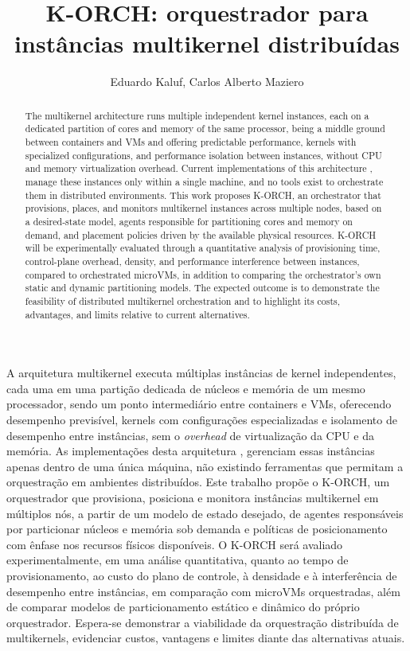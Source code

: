 \documentclass[12pt]{article}
\title{K-ORCH: orquestrador para instâncias multikernel distribuídas}
\author{Eduardo Kaluf\inst{1}, Carlos Alberto Maziero\inst{2}}
\begin{document}
 

\maketitle

\begin{abstract}
  The multikernel architecture runs multiple independent kernel instances, each on a dedicated partition of cores and memory of
  the same processor, being a middle ground between containers and VMs and offering predictable
  performance, kernels with specialized configurations, and performance isolation between instances, without CPU and
  memory virtualization overhead.
  Current implementations of this architecture \cite{wang2025multikernel},
  manage these instances only within a single machine, and no tools exist to orchestrate them in distributed environments.
  This work proposes K-ORCH, an orchestrator that provisions, places, and monitors multikernel instances across
  multiple nodes, based on a desired-state model, agents responsible for partitioning cores and memory on demand,
  and placement policies driven by the available physical resources.
  K-ORCH will be experimentally evaluated through a quantitative analysis of provisioning time, control-plane overhead,
  density, and performance interference between instances, compared to orchestrated microVMs, in addition to comparing
  the orchestrator's own static and dynamic partitioning models.
  The expected outcome is to demonstrate the feasibility of distributed multikernel orchestration and to highlight its
  costs, advantages, and limits relative to current alternatives.
\end{abstract}

\begin{resumo}
  A arquitetura multikernel executa múltiplas instâncias de kernel independentes, cada uma em uma partição dedicada
  de núcleos e memória de um mesmo processador, sendo um ponto intermediário entre containers e VMs,
  oferecendo desempenho previsível, kernels com configurações especializadas e isolamento de desempenho entre instâncias,
  sem o \textit{overhead} de virtualização da CPU e da memória.
  As implementações desta arquitetura \cite{wang2025multikernel}, gerenciam essas
  instâncias apenas dentro de uma única máquina, não existindo ferramentas que permitam a orquestração em ambientes distribuídos.
  Este trabalho propõe o K-ORCH, um orquestrador que provisiona, posiciona e monitora instâncias multikernel em múltiplos nós,
  a partir de um modelo de estado desejado, de agentes responsáveis por particionar núcleos e memória sob demanda e políticas de posicionamento
  com ênfase nos recursos físicos disponíveis.
  O K-ORCH será avaliado experimentalmente, em uma análise quantitativa, quanto ao tempo de
  provisionamento, ao custo do plano de controle, à densidade e à interferência de desempenho entre instâncias,
  em comparação com microVMs orquestradas, além de comparar modelos de particionamento estático e dinâmico do próprio orquestrador.
  Espera-se demonstrar a viabilidade da orquestração distribuída de multikernels, evidenciar custos, vantagens e limites
  diante das alternativas atuais.
\end{resumo}
\end{document}
